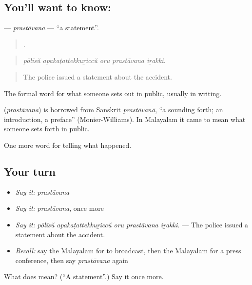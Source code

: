 \subsection*{You'll want to know: }
\textbf{} — \emph{prastāvana} — \textquotedblleft{}a statement\textquotedblright{}.

\begin{quote}
    .
\end{quote}

\begin{quote}
\emph{pōlīsŭ apakaṭattekkuṟiccŭ oru prastāvana iṟakki.}
\end{quote}

\begin{quote}
The police issued a statement about the accident.
\end{quote}

The formal word for what someone sets out in public, usually in writing.

\begin{cousinweb}
\textbf{} (\emph{prastāvana}) is borrowed from Sanskrit \emph{prastāvanā}, \textquotedblleft{}a sounding forth; an introduction, a preface\textquotedblright{} (Monier-Williams). In Malayalam it came to mean what someone sets forth in public.
\end{cousinweb}

\begin{grammarlens}[title={What you've built}]
One more word for telling what happened.
\end{grammarlens}

\subsection*{Your turn}
\begin{itemize}
\raggedright
  \item \emph{Say it:} \emph{prastāvana}
  \item \emph{Say it:} \emph{prastāvana}, once more
  \item \emph{Say it:} \emph{pōlīsŭ apakaṭattekkuṟiccŭ oru prastāvana iṟakki.} — The police issued a statement about the accident.
  \item \emph{Recall:} say the Malayalam for to broadcast, then the Malayalam for a press conference, then say \emph{prastāvana} again
\end{itemize}

\begin{tcolorbox}[breakable,colback=teal!4,colframe=teal!35!black,title={Before you move on}]
What does  mean? (\textquotedblleft{}A statement\textquotedblright{}.) Say it once more.
\end{tcolorbox}
